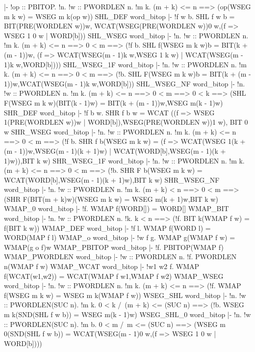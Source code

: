 |- !op :: PBITOP.
    !n.
     !w :: PWORDLEN n.
      !m k. (m + k) <= n ==> (op(WSEG m k w) = WSEG m k(op w))
\ENDTHEOREM
\THEOREM SHL\_DEF word\_bitop
|- !f w b.
    SHL f w b =
    BIT(PRE(WORDLEN w))w,
    WCAT(WSEG(PRE(WORDLEN w))0 w,(f => WSEG 1 0 w | WORD[b]))
\ENDTHEOREM
\THEOREM SHL\_WSEG word\_bitop
|- !n.
    !w :: PWORDLEN n.
     !m k.
      (m + k) <= n ==>
      0 < m ==>
      (!f b.
        SHL f(WSEG m k w)b =
        BIT(k + (m - 1))w,
        (f => 
         WCAT(WSEG(m - 1)k w,WSEG 1 k w) | 
         WCAT(WSEG(m - 1)k w,WORD[b])))
\ENDTHEOREM
\THEOREM SHL\_WSEG\_1F word\_bitop
|- !n.
    !w :: PWORDLEN n.
     !m k.
      (m + k) <= n ==>
      0 < m ==>
      (!b.
        SHL F(WSEG m k w)b =
        BIT(k + (m - 1))w,WCAT(WSEG(m - 1)k w,WORD[b]))
\ENDTHEOREM
\THEOREM SHL\_WSEG\_NF word\_bitop
|- !n.
    !w :: PWORDLEN n.
     !m k.
      (m + k) <= n ==>
      0 < m ==>
      0 < k ==>
      (SHL F(WSEG m k w)(BIT(k - 1)w) =
       BIT(k + (m - 1))w,WSEG m(k - 1)w)
\ENDTHEOREM
\THEOREM SHR\_DEF word\_bitop
|- !f b w.
    SHR f b w =
    WCAT
    ((f => WSEG 1(PRE(WORDLEN w))w | WORD[b]),WSEG(PRE(WORDLEN w))1 w),
    BIT 0 w
\ENDTHEOREM
\THEOREM SHR\_WSEG word\_bitop
|- !n.
    !w :: PWORDLEN n.
     !m k.
      (m + k) <= n ==>
      0 < m ==>
      (!f b.
        SHR f b(WSEG m k w) =
        (f => 
         WCAT(WSEG 1(k + (m - 1))w,WSEG(m - 1)(k + 1)w) | 
         WCAT(WORD[b],WSEG(m - 1)(k + 1)w)),BIT k w)
\ENDTHEOREM
\THEOREM SHR\_WSEG\_1F word\_bitop
|- !n.
    !w :: PWORDLEN n.
     !m k.
      (m + k) <= n ==>
      0 < m ==>
      (!b.
        SHR F b(WSEG m k w) = WCAT(WORD[b],WSEG(m - 1)(k + 1)w),BIT k w)
\ENDTHEOREM
\THEOREM SHR\_WSEG\_NF word\_bitop
|- !n.
    !w :: PWORDLEN n.
     !m k.
      (m + k) < n ==>
      0 < m ==>
      (SHR F(BIT(m + k)w)(WSEG m k w) = WSEG m(k + 1)w,BIT k w)
\ENDTHEOREM
\THEOREM WMAP\_0 word\_bitop
|- !f. WMAP f(WORD[]) = WORD[]
\ENDTHEOREM
\THEOREM WMAP\_BIT word\_bitop
|- !n.
    !w :: PWORDLEN n. !k. k < n ==> (!f. BIT k(WMAP f w) = f(BIT k w))
\ENDTHEOREM
\THEOREM WMAP\_DEF word\_bitop
|- !f l. WMAP f(WORD l) = WORD(MAP f l)
\ENDTHEOREM
\THEOREM WMAP\_o word\_bitop
|- !w f g. WMAP g(WMAP f w) = WMAP(g o f)w
\ENDTHEOREM
\THEOREM WMAP\_PBITOP word\_bitop
|- !f. PBITOP(WMAP f)
\ENDTHEOREM
\THEOREM WMAP\_PWORDLEN word\_bitop
|- !w :: PWORDLEN n. !f. PWORDLEN n(WMAP f w)
\ENDTHEOREM
\THEOREM WMAP\_WCAT word\_bitop
|- !w1 w2 f. WMAP f(WCAT(w1,w2)) = WCAT(WMAP f w1,WMAP f w2)
\ENDTHEOREM
\THEOREM WMAP\_WSEG word\_bitop
|- !n.
    !w :: PWORDLEN n.
     !m k.
      (m + k) <= n ==> (!f. WMAP f(WSEG m k w) = WSEG m k(WMAP f w))
\ENDTHEOREM
\THEOREM WSEG\_SHL word\_bitop
|- !n.
    !w :: PWORDLEN(SUC n).
     !m k.
      0 < k /\ (m + k) <= (SUC n) ==>
      (!b. WSEG m k(SND(SHL f w b)) = WSEG m(k - 1)w)
\ENDTHEOREM
\THEOREM WSEG\_SHL\_0 word\_bitop
|- !n.
    !w :: PWORDLEN(SUC n).
     !m b.
      0 < m /\ m <= (SUC n) ==>
      (WSEG m 0(SND(SHL f w b)) =
       WCAT(WSEG(m - 1)0 w,(f => WSEG 1 0 w | WORD[b])))
\ENDTHEOREM
